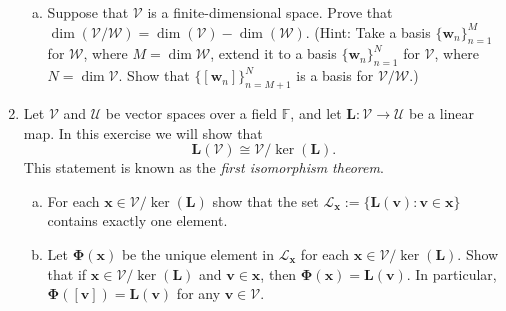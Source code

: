 \documentclass[12pt]{amsart}
\newcommand{\1}{\mathbbm{1}}
\numberwithin{equation}{section}
\numberwithin{Theorem}{section}
\theoremstyle{plain} %
\theoremstyle{definition}
\theoremstyle{remark}
\begin{document}
\begin{enumerate}[1.]
\begin{enumerate}[(a)]
\item Suppose that \(\mathcal{V}\) is a finite-dimensional space. Prove that \(\operatorname{dim}(\mathcal{V}/\mathcal{W}) = \operatorname{dim}(\mathcal{V}) - \operatorname{dim}(\mathcal{W})\). (Hint: Take a basis \(\{\mathbf{w}_{n}\}_{n=1}^{M}\) for \(\mathcal{W}\), where \(M=\operatorname{dim}\mathcal{W}\), extend it to a basis \(\{\mathbf{w}_{n}\}_{n=1}^{N}\) for \(\mathcal{V}\), where \(N=\operatorname{dim}\mathcal{V}\). Show that \(\{[\mathbf{w}_{n}]\}_{n=M+1}^{N}\) is a basis for \(\mathcal{V}/\mathcal{W}\).)

\bigskip

\end{enumerate}

	
	
	

\clearpage

\item Let \(\mathcal{V}\) and \(\mathcal{U}\) be vector spaces over a field \(\mathbb{F}\), and let \(\mathbf{L}:\mathcal{V}\to\mathcal{U}\) be a linear map. In this exercise we will show that
\[\mathbf{L}(\mathcal{V})\cong \mathcal{V}/\operatorname{ker}(\mathbf{L}).\]
This statement is known as the \textit{first isomorphism theorem}.

\bigskip

\begin{enumerate}[(a)]

\item For each \(\mathbf{x}\in\mathcal{V}/\operatorname{ker}(\mathbf{L})\) show that the set \(\mathcal{L}_{\mathbf{x}}:=\{\mathbf{L}(\mathbf{v}) : \mathbf{v}\in\mathbf{x}\}\) contains exactly one element.

\bigskip

	
	
	

\item Let \(\mathbf{\Phi}(\mathbf{x})\) be the unique element in \(\mathcal{L}_{\mathbf{x}}\) for each \(\mathbf{x}\in\mathcal{V}/\operatorname{ker}(\mathbf{L})\). Show that if \(\mathbf{x}\in\mathcal{V}/\operatorname{ker}(\mathbf{L})\) and \(\mathbf{v}\in\mathbf{x}\), then \(\mathbf{\Phi}(\mathbf{x}) = \mathbf{L}(\mathbf{v})\). In particular, \(\mathbf{\Phi}([\mathbf{v}]) = \mathbf{L}(\mathbf{v})\) for any \(\mathbf{v}\in\mathcal{V}\). 


\end{enumerate}
\end{enumerate}
\end{document}
